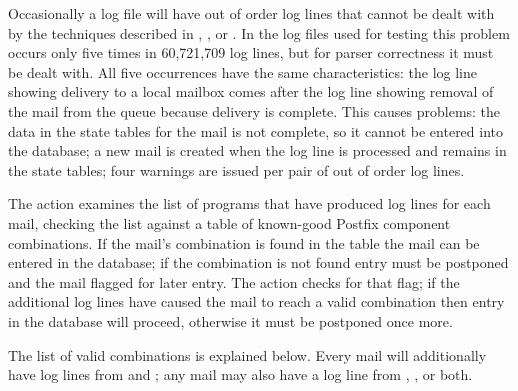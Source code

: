 \label{out of order log lines}

Occasionally a log file will have out of order log lines that cannot be
dealt with by the techniques described in , , or .  In the \numberOFlogFILES{} log files used for
testing this problem occurs only five times in 60,721,709 log lines, but
for parser correctness it must be dealt with.  All five occurrences have
the same characteristics: the  log line showing delivery to a
local mailbox comes after the  log line showing removal of the
mail from the queue because delivery is complete.  This causes problems:
the data in the state tables for the mail is not complete, so it cannot be
entered into the database; a new mail is created when the 
log line is processed and remains in the state tables; four warnings are
issued per pair of out of order log lines.

The  action examines the list of programs that have produced
log lines for each mail, checking the list against a table of known-good
Postfix component combinations.  If the mail's combination is found in the
table the mail can be entered in the database; if the combination is not
found entry must be postponed and the mail flagged for later entry.  The
 action checks for that flag; if the additional log
lines have caused the mail to reach a valid combination then entry in the
database will proceed, otherwise it must be postponed once more.

The list of valid combinations is explained below.  Every mail will
additionally have log lines from  and ; any
mail may also have a log line from , , or
both.

